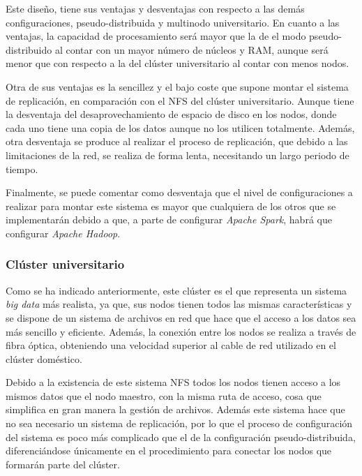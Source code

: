 Este diseño, tiene sus ventajas y desventajas con respecto a las demás configuraciones, pseudo-distribuida y multinodo universitario. En cuanto a las ventajas, la capacidad de procesamiento será mayor que la de el modo pseudo-distribuido al contar con un mayor número de núcleos y \gls{RAM}, aunque será menor que con respecto a la del clúster universitario al contar con menos nodos.

Otra de sus ventajas es la sencillez y el bajo coste que supone montar el sistema de replicación, en comparación con el \gls{NFS} del clúster universitario. Aunque tiene la desventaja del desaprovechamiento de espacio de disco en los nodos, donde cada uno tiene una copia de los datos aunque no los utilicen totalmente. Además, otra desventaja se produce al realizar el proceso de replicación, que debido a las limitaciones de la red, se realiza de forma lenta, necesitando un largo periodo de tiempo.

Finalmente, se puede comentar como desventaja que el nivel de configuraciones a realizar para montar este sistema es mayor que cualquiera de los otros que se implementarán debido a que, a parte de configurar \textit{Apache Spark}, habrá que configurar \textit{Apache Hadoop}.

\subsubsection{Clúster universitario \label{disUni}}
Como se ha indicado anteriormente, este clúster es el que representa un sistema \textit{big data} más realista, ya que, sus nodos tienen todos las mismas características y se dispone de un sistema de archivos en red que hace que el acceso a los datos sea más sencillo y eficiente. Además, la conexión entre los nodos se realiza a través de fibra óptica, obteniendo una velocidad superior al cable de red utilizado en el clúster doméstico.

Debido a la existencia de este sistema \gls{NFS} todos los nodos tienen acceso a los mismos datos que el nodo maestro, con la misma ruta de acceso, cosa que simplifica en gran manera la gestión de archivos. Además este sistema hace que no sea necesario un sistema de replicación, por lo que el proceso de  configuración del sistema es poco más complicado que el de la configuración pseudo-distribuida, diferenciándose únicamente en el procedimiento para conectar los nodos que formarán parte del clúster.

